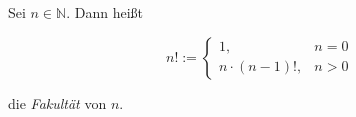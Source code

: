 Sei $n \in \mathbb{N}$. Dann heißt 

$$
n! := \begin{cases}
1, & n=0 \\
n \cdot (n-1)!, & n>0
\end{cases}
$$

die \textit{Fakultät} von $n$.